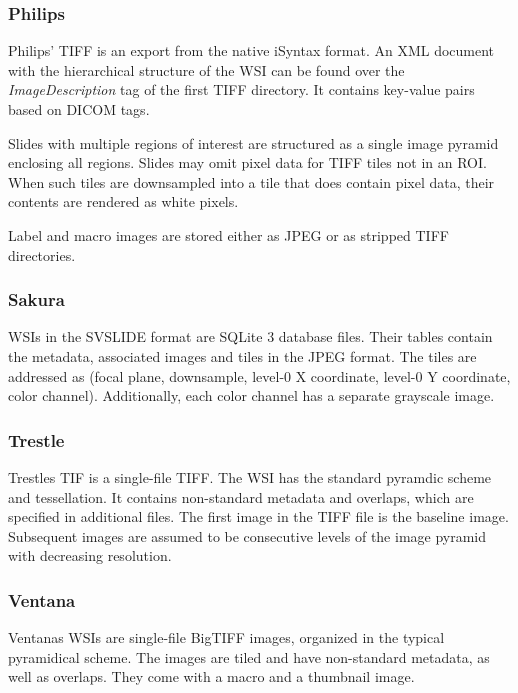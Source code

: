 \subsubsection{Philips}
Philips' TIFF is an export from the native iSyntax format. An XML document with the hierarchical structure of the WSI can be found over the \emph{ImageDescription} tag of the first TIFF directory. It contains key-value pairs based on DICOM tags\cite{web:openslide}.

Slides with multiple regions of interest are structured as a single image pyramid enclosing all regions. Slides may omit pixel data for TIFF tiles not in an ROI. When such tiles are downsampled into a tile that does contain pixel data, their contents are rendered as white pixels\cite{web:openslide}.

Label and macro images are stored either as JPEG or as stripped TIFF directories.


\subsubsection{Sakura}
WSIs in the SVSLIDE format are SQLite 3 database files. Their tables contain the metadata, associated images and tiles in the JPEG format. The tiles are addressed as (focal plane, downsample, level-0 X coordinate, level-0 Y coordinate, color channel). Additionally, each color channel has a separate grayscale image\cite{web:openslide}.


\subsubsection{Trestle}
Trestles TIF is a single-file TIFF. The WSI has the standard pyramdic scheme and tessellation. It contains non-standard metadata and overlaps, which are specified in additional files. The first image in the TIFF file is the baseline image. Subsequent images are assumed to be consecutive levels of the image pyramid with decreasing resolution\cite{web:openslide}.


\subsubsection{Ventana}
Ventanas WSIs are single-file BigTIFF images, organized in the typical pyramidical scheme. The images are tiled and have non-standard metadata, as well as overlaps. They come with a macro and a thumbnail image\cite{web:openslide}.

	
